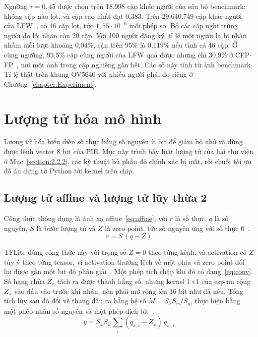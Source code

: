 \documentclass[../DoAn.tex]{subfiles}
\begin{document}
Ngưỡng $\tau = 0{,}45$ được chọn trên 18.998 cặp khác người của sáu bộ benchmark:
không cặp nào lọt, và cặp cao nhất đạt 0,383. Trên 29.640.749 cặp khác
người của LFW~\cite{lfw}, có 46 cặp lọt, tức $1{,}55\cdot10^{-6}$ mỗi phép so. Bỏ
các cặp nghi trùng người do lỗi nhãn còn 20 cặp. Với 100 người đăng ký, tỉ lệ một
người lạ bị nhận nhầm mỗi lượt khoảng 0,04\%, cận trên 95\% là 0,119\% nếu tính cả
46 cặp. Ở cùng ngưỡng, 93,5\% cặp cùng người của LFW qua được nhưng chỉ 30,9\% ở
CFP-FP~\cite{cfp}, nơi một ảnh trong cặp nghiêng gần hết. Các số này tính từ ảnh
benchmark. Tỉ lệ thật trên khung OV5640 với nhiều người phải đo riêng ở
Chương~\ref{chapter:Experiment}.

\section{Lượng tử hóa mô hình}
\label{section:2.4}

Lượng tử hóa biểu diễn số thực bằng số nguyên ít bit để giảm bộ nhớ và dùng được
lệnh vector 8 bit của PIE. Mục này trình bày luật lượng tử của hai thư viện ở
Mục~\ref{section:2.2.2}, các kỹ thuật bù phần độ chính xác bị mất, rồi chuỗi tối ưu
đồ án dựng từ Python tới kernel trên chip.

\subsection{Lượng tử affine và lượng tử lũy thừa 2}
\label{section:2.4.1}

Công thức thông dụng là ánh xạ affine~\eqref{eq:affine}, với $r$ là số thực, $q$
là số nguyên, $S$ là bước lượng tử và $Z$ là zero point, tức số nguyên ứng với số
thực 0~\cite{jacob2018}.
\begin{equation}
r = S\,(q - Z)
\label{eq:affine}
\end{equation}

TFLite dùng công thức này với trọng số $Z = 0$ theo từng kênh, và activation có
$Z$ tùy ý theo từng tensor, vì activation thường lệch về một phía và zero point
đổi lại được gần một bit độ phân giải~\cite{litertquant}. Một phép tích chập khi
đó có dạng~\eqref{eq:conv}. Số hạng chứa $Z_x$ tách ra được thành hằng số, nhưng
kernel 1$\times$1 của esp-nn cộng $Z_x$ vào đầu vào trước khi nhân, nên phải mở rộng
lên 16 bit như đã nêu. Tổng tích lũy sau đó đổi về thang đầu ra bằng hệ số
$M = S_x S_w / S_y$, thực hiện bằng một phép nhân số nguyên và một phép dịch
bit~\cite{jacob2018}.
\begin{equation}
y = S_x S_w \sum_i (q_{x,i} - Z_x)\, q_{w,i}
\label{eq:conv}
\end{equation}
\end{document}
